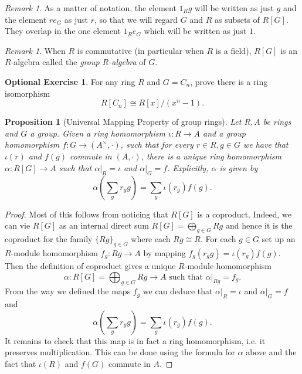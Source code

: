 \documentclass{amsart}[12pt]
\def\a{\alpha}
\numberwithin{equation}{section}
\theoremstyle{plain} %
\newtheorem{prop}[equation]{Proposition}
\theoremstyle{definition}
\newtheorem{exer}[equation]{Optional Exercise}
\theoremstyle{remark}
\newtheorem{rem}[equation]{Remark}
\begin{document}
\begin{rem}
As a matter of notation,
the element $1_R g$ will be written as just $g$ and the element $r e_G$ as just $r$,
so that we will regard $G$ and $R$ as subsets of $R[G]$. They overlap in the one element $1_R e_G$ which will be written as just $1$.
\end{rem}

\begin{rem}
When $R$ is commutative (in particular when $R$ is a field), $R[G]$ is an $R$-algebra called the {\em group $R$-algebra} of $G$.\end{rem}

\begin{exer} For any ring $R$ and $G = C_n$, prove there is a ring isomorphism 
\[R[C_n] \cong R[x]/(x^n -1).\] 
\end{exer}


\begin{prop}[Universal Mapping Property of group rings]
\label{prop815}
  Let $R, A$ be rings and $G$ a group.
  Given a ring homomorphism $\iota: R \to A$ and a group
  homomorphism $f: G \to (A^\times, \cdot)$, such that for every $r\in R, g\in G$ we have that $\iota(r)$ and $f(g)$ commute in $(A,\cdot)$,
there is a unique ring homomorphism $\a: R[G] \to A$ such that $\a|_R = \iota$
  and $\a|_G = f$. Explicitly, $\a$ is given by
   $$
  \a\left(\sum_g r_g g\right) = \sum_g \iota(r_g) f(g).
  $$
\end{prop}

\begin{proof} Most of this follows from noticing that $R[G]$ is a coproduct. Indeed, we can vie $R[G]$ as an internal direct sum $R[G]=\bigoplus_{g\in G} Rg$ and hence it is the coproduct for the family $\{Rg\}_{g\in G}$ where each $Rg\cong R$. For each $g\in G$ set up an $R$-module homomorphism $f_g: Rg\to A$ by mapping $f_g(r_gg)=\iota(r_g)f(g)$. Then the definition of coproduct gives a unique $R$-module homomorphism 
\[
\a: R[G]=\bigoplus_{g\in G} Rg \to A \text{ such that } \a|_{Rg}=f_g.
\]
From the way we defined the maps $f_g$ we can deduce that $\a|_R = \iota$
  and $\a|_G = f$ and
   $$
  \a\left(\sum_g r_g g\right) = \sum_g \iota(r_g) f(g).
  $$
  It remains to check that this map is in fact a ring homomorphism, i.e. it preserves multiplication. This can be done using the formula for $\alpha$ above and the fact that $\iota(R)$ and $f(G)$ commute in $A$.
\end{proof}
\end{document}
